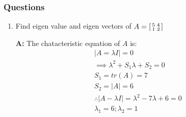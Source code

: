 \documentclass[english,course,fleqn]{lecture}
\newenvironment{qanda}{\begin{enumerate}\setlength{\parindent}{0pt}}{\medskip\end{enumerate}}
\newcommand{\Q}{\bigskip\bfseries \item}
\newcommand{\A}{\par\textbf{A:} \normalfont}
\begin{document}
  \subsubsection{Questions}

  \begin{qanda}
    \Q Find eigen value and eigen vectors of $A = \begin{bsmallmatrix}
      5 & 4 \\
      1 & 2 \\
    \end{bsmallmatrix}$

    \A The chatacteristic equation of $A$ is:
    \begin{gather*}
      |A = \lambda I| = 0\\
      \implies \lambda^{2} + S_{1} \lambda + S_{2} = 0\\
      S_{1} = tr(A) = 7\\
      S_{2} = |A| = 6
      \\
      \therefore |A - \lambda I| = \lambda^{2} - 7 \lambda + 6 = 0\\
      \lambda_{1} = 6;\lambda_{2} = 1
    \end{gather*}


\end{qanda}
\end{document}
